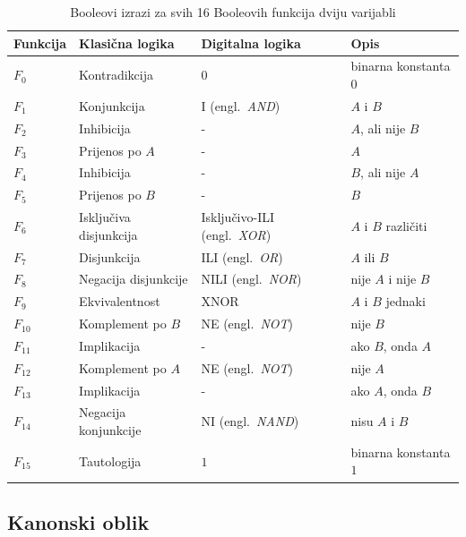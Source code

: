 \documentclass[times, utf8, diplomski]{fer}
\begin{document}
\begin{table}[htb]
	\centering
	\caption{Booleovi izrazi za svih 16 Booleovih funkcija dviju varijabli}
	\label{tab:16expr}
	\begin{tabular}{|l|l|l|l|}
		\hline
		Funkcija 	& Klasična logika 			& Digitalna logika 			& Opis \\
		\hline
		$F_{0}$ 	& Kontradikcija 			& $0$ 						& binarna konstanta $0$ \\
		$F_{1}$ 	& Konjunkcija 				& I (engl.~\textit{AND}) 	& $A$ i $B$ \\
		$F_{2}$ 	& Inhibicija 				& - 						& $A$, ali nije $B$ \\
		$F_{3}$ 	& Prijenos po $A$ 			& - 						& $A$ \\
		$F_{4}$ 	& Inhibicija 				& - 						& $B$, ali nije $A$ \\
		$F_{5}$ 	& Prijenos po $B$ 			& - 						& $B$ \\
		$F_{6}$ 	& Isključiva disjunkcija 	& Isključivo-ILI (engl.~\textit{XOR}) & $A$ i $B$ različiti \\
		$F_{7}$ 	& Disjunkcija 				& ILI (engl.~\textit{OR}) 	& $A$ ili $B$ \\
		$F_{8}$ 	& Negacija disjunkcije 		& NILI (engl.~\textit{NOR}) & nije $A$ i nije $B$ \\
		$F_{9}$ 	& Ekvivalentnost 			& XNOR 						& $A$ i $B$ jednaki \\
		$F_{10}$ 	& Komplement po $B$ 		& NE (engl.~\textit{NOT}) 	& nije $B$ \\
		$F_{11}$ 	& Implikacija 				& - & ako $B$, onda $A$ \\
		$F_{12}$ 	& Komplement po $A$ 		& NE (engl.~\textit{NOT}) 	& nije $A$ \\
		$F_{13}$ 	& Implikacija 				& - & ako $A$, onda $B$ \\
		$F_{14}$ 	& Negacija konjunkcije 		& NI (engl.~\textit{NAND}) 	& nisu $A$ i $B$ \\
		$F_{15}$ 	& Tautologija 				& $1$ 						& binarna konstanta $1$ \\
		\hline
	\end{tabular}
\end{table}

\subsection{Kanonski oblik}
\end{document}
